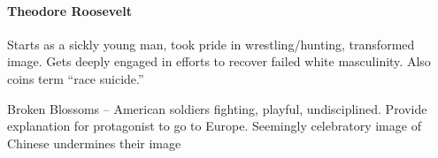 \paragraph{Theodore Roosevelt} Starts as a sickly young man, took pride in wrestling/hunting, transformed image. Gets deeply engaged in efforts to recover failed white masculinity. Also coins term ``race suicide.''

Broken Blossoms -- American soldiers fighting, playful, undisciplined. Provide explanation for protagonist to go to Europe. Seemingly celebratory image of Chinese undermines their image